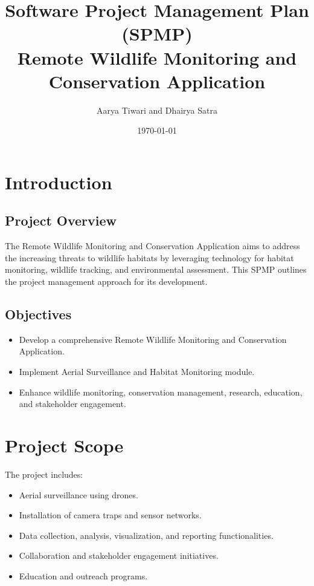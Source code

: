\documentclass{article}
\title{Software Project Management Plan (SPMP)\\Remote Wildlife Monitoring and Conservation Application}
\author{Aarya Tiwari and Dhairya Satra}
\date{\today}
\begin{document}
\maketitle

\tableofcontents
\newpage

\section{Introduction}

\subsection{Project Overview}

The Remote Wildlife Monitoring and Conservation Application aims to address the increasing threats to wildlife habitats by leveraging technology for habitat monitoring, wildlife tracking, and environmental assessment. This SPMP outlines the project management approach for its development.

\subsection{Objectives}

\begin{itemize}
    \item Develop a comprehensive Remote Wildlife Monitoring and Conservation Application.
    \item Implement Aerial Surveillance and Habitat Monitoring module.
    \item Enhance wildlife monitoring, conservation management, research, education, and stakeholder engagement.
\end{itemize}

\section{Project Scope}

The project includes:

\begin{itemize}
    \item Aerial surveillance using drones.
    \item Installation of camera traps and sensor networks.
    \item Data collection, analysis, visualization, and reporting functionalities.
    \item Collaboration and stakeholder engagement initiatives.
    \item Education and outreach programs.
\end{itemize}
\end{document}
